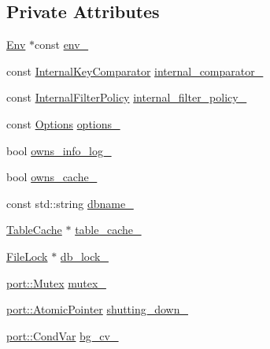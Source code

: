 \subsection*{Private Attributes}
\begin{DoxyCompactItemize}
\item 
\hyperlink{classleveldb_1_1_env}{Env} $\ast$const \hyperlink{classleveldb_1_1_d_b_impl_a7fb25ed1dcd76b241029e036d3d2fdf0}{env\-\_\-}
\item 
const \hyperlink{classleveldb_1_1_internal_key_comparator}{Internal\-Key\-Comparator} \hyperlink{classleveldb_1_1_d_b_impl_a2d1fd471ffca17ebfeabf19134d4fc65}{internal\-\_\-comparator\-\_\-}
\item 
const \hyperlink{classleveldb_1_1_internal_filter_policy}{Internal\-Filter\-Policy} \hyperlink{classleveldb_1_1_d_b_impl_a4851ba3817eeffd4a3777c2f7965177f}{internal\-\_\-filter\-\_\-policy\-\_\-}
\item 
const \hyperlink{structleveldb_1_1_options}{Options} \hyperlink{classleveldb_1_1_d_b_impl_a09b2c1705618db98346b53f16ff16b64}{options\-\_\-}
\item 
bool \hyperlink{classleveldb_1_1_d_b_impl_a9a8de086d118c52c8e6e8dd78eab01ef}{owns\-\_\-info\-\_\-log\-\_\-}
\item 
bool \hyperlink{classleveldb_1_1_d_b_impl_aa790324b036b59ee0d50c5683f336648}{owns\-\_\-cache\-\_\-}
\item 
const std\-::string \hyperlink{classleveldb_1_1_d_b_impl_a3201a4624ce75ecfaf67ebac29ca2697}{dbname\-\_\-}
\item 
\hyperlink{classleveldb_1_1_table_cache}{Table\-Cache} $\ast$ \hyperlink{classleveldb_1_1_d_b_impl_aa69f3829c65fc2a0149b29926fb6fefc}{table\-\_\-cache\-\_\-}
\item 
\hyperlink{classleveldb_1_1_file_lock}{File\-Lock} $\ast$ \hyperlink{classleveldb_1_1_d_b_impl_ab2f1418890b6cd48e748805378517a5e}{db\-\_\-lock\-\_\-}
\item 
\hyperlink{classleveldb_1_1port_1_1_mutex}{port\-::\-Mutex} \hyperlink{classleveldb_1_1_d_b_impl_ac591585d5dea970b4bd1beb7553ce197}{mutex\-\_\-}
\item 
\hyperlink{classleveldb_1_1port_1_1_atomic_pointer}{port\-::\-Atomic\-Pointer} \hyperlink{classleveldb_1_1_d_b_impl_a11435d0d1f43c76d34b3133c91c2afe4}{shutting\-\_\-down\-\_\-}
\item 
\hyperlink{classleveldb_1_1port_1_1_cond_var}{port\-::\-Cond\-Var} \hyperlink{classleveldb_1_1_d_b_impl_a44a499ab00f5139ffbca3a57707bd2d2}{bg\-\_\-cv\-\_\-}
\item 

\end{DoxyCompactItemize}
